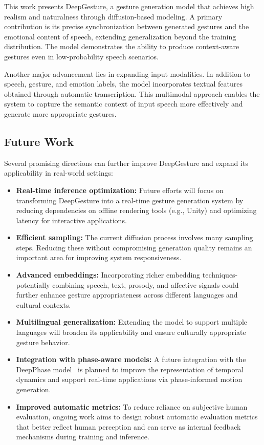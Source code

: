 This work presents DeepGesture, a gesture generation model that achieves high realism and naturalness through diffusion-based modeling. A primary contribution is its precise synchronization between generated gestures and the emotional content of speech, extending generalization beyond the training distribution. The model demonstrates the ability to produce context-aware gestures even in low-probability speech scenarios.

Another major advancement lies in expanding input modalities. In addition to speech, gesture, and emotion labels, the model incorporates textual features obtained through automatic transcription. This multimodal approach enables the system to capture the semantic context of input speech more effectively and generate more appropriate gestures.

\subsection{Future Work}

Several promising directions can further improve DeepGesture and expand its applicability in real-world settings:

\begin{itemize}
	\item \textbf{Real-time inference optimization:} Future efforts will focus on transforming DeepGesture into a real-time gesture generation system by reducing dependencies on offline rendering tools (e.g., Unity) and optimizing latency for interactive applications.
	
	\item \textbf{Efficient sampling:} The current diffusion process involves many sampling steps. Reducing these without compromising generation quality remains an important area for improving system responsiveness.
	
	\item \textbf{Advanced embeddings:} Incorporating richer embedding techniques-potentially combining speech, text, prosody, and affective signals-could further enhance gesture appropriateness across different languages and cultural contexts.
	
	\item \textbf{Multilingual generalization:} Extending the model to support multiple languages will broaden its applicability and ensure culturally appropriate gesture behavior.
	
	\item \textbf{Integration with phase-aware models:} A future integration with the DeepPhase model~\cite{starke2022deepphase} is planned to improve the representation of temporal dynamics and support real-time applications via phase-informed motion generation.
	
	\item \textbf{Improved automatic metrics:} To reduce reliance on subjective human evaluation, ongoing work aims to design robust automatic evaluation metrics that better reflect human perception and can serve as internal feedback mechanisms during training and inference.
\end{itemize}

